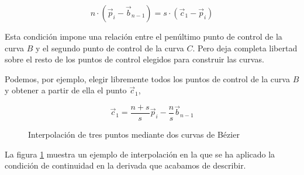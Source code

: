 \begin{equation*}
n\cdot\left(\vec{p}_i-\vec{b}_{n-1}\right) = s\cdot\left(\vec{c}_1-\vec{p}_i\right)
\end{equation*}

Esta condición impone una relación entre el penúltimo punto de control de la curva $B$ y el segundo punto de control de la curva $C$. Pero deja completa libertad sobre el resto de los puntos de control elegidos para construir las curvas.

Podemos, por ejemplo, elegir libremente todos los puntos de control de la curva $B$ y obtener a partir de ella el punto $\vec{c}_1$,

\begin{equation*}
\vec{c}_1 = \frac{n+s}{s}\vec{p}_i - \frac{n}{s}\vec{b}_{n-1}
\end{equation*}

\begin{figure}[h]
\centering
{} \qquad 
{}
\caption{Interpolación de tres puntos mediante dos curvas de Bézier} 
\label{fig:ibz3}
\end{figure}
 

La figura \ref{fig:ibz3} muestra un ejemplo de interpolación en la que se ha aplicado la condición de continuidad en la derivada que acabamos de describir.

